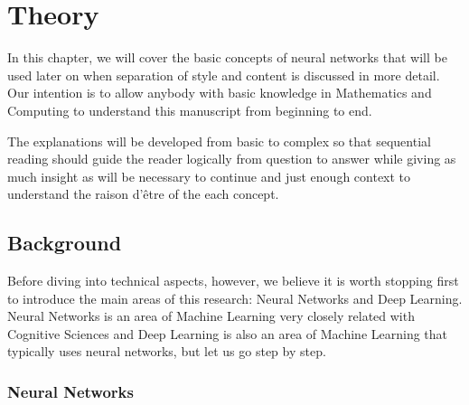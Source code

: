 
\chapter{Theory}
\label{chap:theory}




In this chapter, we will cover the basic concepts of neural networks that will be used later on when separation of style and content is discussed in more detail.
Our intention is to allow anybody with basic knowledge in Mathematics and Computing to understand this manuscript from beginning to end.

The explanations will be developed from basic to complex so that sequential reading should guide the reader logically from question to answer while giving as much insight as will be necessary to continue and just enough context to understand the raison d'être of the each concept.



\section{Background}
\label{sec:theory:background}

Before diving into technical aspects, however, we believe it is worth stopping first to introduce the main areas of this research: Neural Networks and Deep Learning.
Neural Networks is an area of Machine Learning very closely related with Cognitive Sciences and Deep Learning is also an area of Machine Learning that typically uses neural networks, but let us go step by step.


\subsection{Neural Networks}
\label{sub:theory:background:neural-networks}

